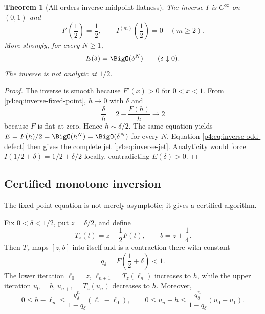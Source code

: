\documentclass[11pt]{article}
\numberwithin{equation}{section}
\newtheorem{theorem}{Theorem}[section]
\theoremstyle{definition}
\theoremstyle{remark}
\begin{document}
\begin{theorem}[All-orders inverse midpoint flatness]
\label{p4:thm:inverse-flatness}
The inverse $I$ is $C^\infty$ on $(0,1)$ and
\begin{equation}
 I'\!\left(\frac12\right)=\frac12,
 \qquad I^{(m)}\!\left(\frac12\right)=0\quad(m\ge2).
 \label{p4:eq:inverse-jet}
\end{equation}
More strongly, for every $N\ge1$,
\begin{equation}
 E(\delta)=\BigO(\delta^N)\qquad(\delta\downarrow0).
 \label{p4:eq:E-flat}
\end{equation}
The inverse is not analytic at $1/2$.
\end{theorem}

\begin{proof}
The inverse is smooth because $F'(x)>0$ for $0<x<1$.  From \eqref{p4:eq:inverse-fixed-point}, $h\to0$ with $\delta$ and
\[
 \frac\delta h=2-\frac{F(h)}h\longrightarrow2
\]
because $F$ is flat at zero.  Hence $h\sim\delta/2$.  The same equation yields
$E=F(h)/2=\BigO(h^N)=\BigO(\delta^N)$ for every $N$.  Equation \eqref{p4:eq:inverse-odd-defect} then gives the complete jet \eqref{p4:eq:inverse-jet}.  Analyticity would force $I(1/2+\delta)=1/2+\delta/2$ locally, contradicting $E(\delta)>0$.
\end{proof}

\subsection{Certified monotone inversion}
The fixed-point equation is not merely asymptotic; it gives a certified algorithm.

\begin{proposition}
\label{p4:prop:certified-iteration}
Fix $0<\delta<1/2$, put $z=\delta/2$, and define
\[
 T_z(t)=z+\frac12F(t),
 \qquad b=z+\frac14.
\]
Then $T_z$ maps $[z,b]$ into itself and is a contraction there with constant
\begin{equation}
 q_\delta=F\!\left(\frac12+\delta\right)<1.
 \label{p4:eq:qdelta}
\end{equation}
The lower iteration $\ell_0=z$, $\ell_{n+1}=T_z(\ell_n)$ increases to $h$, while the upper iteration $u_0=b$, $u_{n+1}=T_z(u_n)$ decreases to $h$.  Moreover,
\begin{equation}
 0\le h-\ell_n\le\frac{q_\delta^n}{1-q_\delta}(\ell_1-\ell_0),
 \qquad
 0\le u_n-h\le\frac{q_\delta^n}{1-q_\delta}(u_0-u_1).
 \label{p4:eq:iteration-errors}
\end{equation}
\end{proposition}
\end{document}
